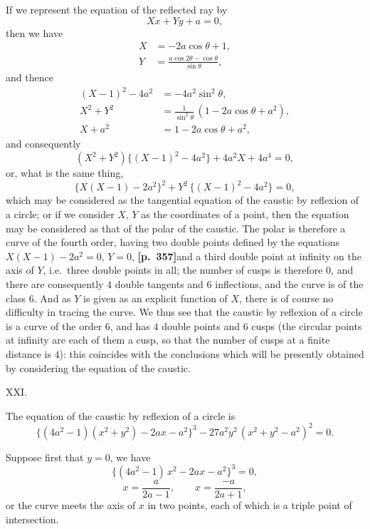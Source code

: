 \documentclass[11pt]{article}
\begin{document}
If we represent the equation of the reflected ray by
\[
Xx + Yy + a = 0,
\]
then we have
\begin{align*}
X &= -2a\cos\theta + 1,\\
Y &= \frac{a\cos 2\theta - \cos\theta}{\sin\theta},
\end{align*}
and thence
\begin{align*}
(X-1)^{2} - 4a^{2} &= -4a^{2}\sin^{2}\theta,\\
X^{2} + Y^{2} &= \frac{1}{\sin^{2}\theta}\,(1 - 2a\cos\theta + a^{2}),\\
X + a^{2} &= 1 - 2a\cos\theta + a^{2},
\end{align*}
and consequently
\[
(X^{2}+Y^{2})\bigl\{(X-1)^{2} - 4a^{2}\bigr\} + 4a^{2}X + 4a^{4} = 0,
\]
or, what is the same thing,
\[
\bigl\{X(X-1) - 2a^{2}\bigr\}^{2} + Y^{2}\,\bigl\{(X-1)^{2} - 4a^{2}\bigr\} = 0,
\]
which may be considered as the tangential equation of the caustic by reflexion of a circle; or if we consider $X$, $Y$ as the coordinates of a point, then the equation may be considered as that of the polar of the caustic. The polar is therefore a curve of the fourth order, having two double points defined by the equations $X(X-1) - 2a^{2} = 0$, $Y = 0$, \textbf{[p.~357]}\quad and a third double point at infinity on the axis of $Y$, i.e.\ three double points in all; the number of cusps is therefore $0$, and there are consequently $4$ double tangents and $6$ inflections, and the curve is of the class $6$. And as $Y$ is given as an explicit function of $X$, there is of course no difficulty in tracing the curve. We thus see that the caustic by reflexion of a circle is a curve of the order $6$, and has $4$ double points and $6$ cusps (the circular points at infinity are each of them a cusp, so that the number of cusps at a finite distance is $4$): this coincides with the conclusions which will be presently obtained by considering the equation of the caustic.

\medskip
\begin{center}XXI.\end{center}

The equation of the caustic by reflexion of a circle is
\[
\bigl\{(4a^{2}-1)(x^{2}+y^{2}) - 2ax - a^{2}\bigr\}^{3} - 27a^{2}y^{2}\,(x^{2}+y^{2} - a^{2})^{2} = 0.
\]

Suppose first that $y = 0$, we have
\[
\bigl\{(4a^{2}-1)\,x^{2} - 2ax - a^{2}\bigr\}^{3} = 0,
\]
\[
x = \frac{a}{2a - 1},\qquad x = \frac{-a}{2a + 1},
\]
or the curve meets the axis of $x$ in two points, each of which is a triple point of intersection.
\end{document}
